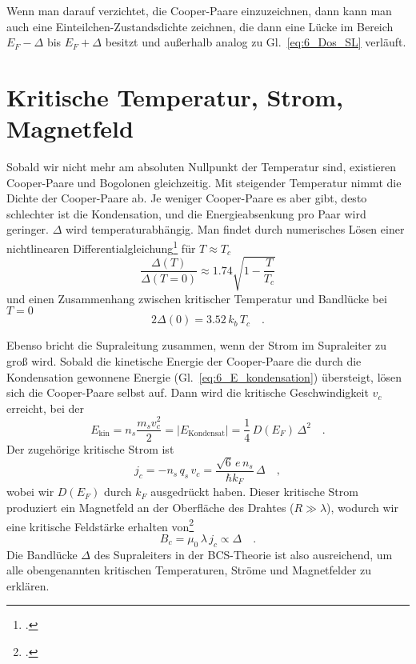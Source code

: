 Wenn man darauf verzichtet, die Cooper-Paare einzuzeichnen, dann kann man auch eine Einteilchen-Zustandsdichte zeichnen, die dann eine Lücke im Bereich $E_F - \Delta$ bis $E_F + \Delta$ besitzt und außerhalb analog zu Gl.~\ref{eq:6_Dos_SL} verläuft.


\section*{Kritische Temperatur, Strom, Magnetfeld}

Sobald wir nicht mehr am absoluten Nullpunkt der Temperatur sind, existieren Cooper-Paare und Bogolonen gleichzeitig. Mit steigender Temperatur nimmt die Dichte der Cooper-Paare ab. Je weniger Cooper-Paare es aber gibt, desto schlechter ist die Kondensation, und die Energieabsenkung pro Paar wird geringer. $\Delta$ wird temperaturabhängig. Man findet durch numerisches Lösen einer nichtlinearen Differentialgleichung\footcite{Gross_FK} für $T \approx T_c$
\begin{equation}
    \frac{\Delta(T)}{\Delta(T=0)} \approx 1.74 \sqrt{1 - \frac{T}{T_c}}
\end{equation}
und einen Zusammenhang zwischen kritischer Temperatur und Bandlücke bei $T=0$
\begin{equation}
    2 \Delta(0) = 3.52  \, k_b  \, T_c \quad .
\end{equation}

Ebenso bricht die Supraleitung zusammen, wenn der Strom im Supraleiter zu groß wird. Sobald die kinetische Energie der Cooper-Paare die durch die Kondensation gewonnene Energie (Gl.~\ref{eq:6_E_kondensation}) übersteigt, lösen sich die Cooper-Paare selbst auf. Dann wird die kritische Geschwindigkeit $v_c$ erreicht, bei der 
\begin{equation}
    E_\text{kin} = n_s \frac{m_s v_c^2}{2} =  | E_\text{Kondensat} |  = \frac{1}{4} \, D(E_F) \, \Delta^2 \quad .
\end{equation}
Der zugehörige kritische Strom ist %
\begin{equation}
    j_c = - n_s \, q_s \,  v_c = \frac{\sqrt{6 } \,  e \, n_s}{\hbar k_F} \, \Delta \quad ,
\end{equation}
wobei wir $D(E_F)$ durch $k_F$ ausgedrückt haben. Dieser kritische Strom produziert ein Magnetfeld an der Oberfläche des Drahtes ($R \gg \lambda$), wodurch wir eine kritische Feldstärke erhalten von\footcite{Hunklinger2014}
\begin{equation}
 B_c = \mu_0 \, \lambda \, j_c  \propto \Delta \quad .
\end{equation}
Die Bandlücke $\Delta$ des Supraleiters in der BCS-Theorie ist also ausreichend, um alle obengenannten kritischen Temperaturen, Ströme und Magnetfelder zu erklären.


